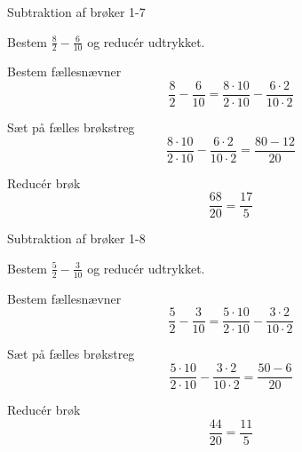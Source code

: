 \documentclass{article}
\begin{document}
	\newpage

\begin{exercise}{Subtraktion af brøker 1-7}
	
	Bestem $\frac{8}{2}-\frac{6}{10}$ og reducér udtrykket.
	
	
	\hint
	
	Bestem fællesnævner
	\[
	\frac{8}{2}-\frac{6}{10}  = \frac{8 \cdot 10}{2 \cdot 10}-\frac{6 \cdot 2}{10 \cdot 2} 
	\]
	
	\hint
	
	Sæt på fælles brøkstreg
	\[
	\frac{8 \cdot 10}{2 \cdot 10}-\frac{6 \cdot 2}{10 \cdot 2}    = \frac{80-12}{20} 
	\]
	
	\hint
	
	Reducér brøk
	\[
	\frac{68}{20} = \frac{17}{5}
	\]
	
\end{exercise}

	\newpage

\begin{exercise}{Subtraktion af brøker 1-8}
	
	Bestem $\frac{5}{2}-\frac{3}{10}$ og reducér udtrykket.
	
	
	\hint
	
	Bestem fællesnævner
	\[
	\frac{5}{2}-\frac{3}{10}  = \frac{5 \cdot 10}{2 \cdot 10}-\frac{3 \cdot 2}{10 \cdot 2} 
	\]
	
	\hint
	
	Sæt på fælles brøkstreg
	\[
	\frac{5 \cdot 10}{2 \cdot 10}-\frac{3 \cdot 2}{10 \cdot 2}     = \frac{50-6}{20} 
	\]
	
	\hint
	
	Reducér brøk
	\[
	\frac{44}{20} = \frac{11}{5}
	\]
	
\end{exercise}
	
\end{document}
